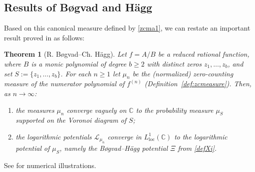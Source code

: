 \documentclass[12pt]{article}
\theoremstyle{plain}
\newtheorem{theorem}{Theorem}
\theoremstyle{definition}
\begin{document}
\subsection{Results of B\o gvad and H\"agg}\label{subsec31}

Based on this canonical measure defined by \eqref{zcma1}, we can restate an important result proved in \cite{B:H} as follows:

\begin{theorem}[R. B\o gvad--Ch. H\"agg]\label{thr1}
Let $f=A/B$ be a reduced rational function, where $B$ is a monic polynomial of degree
$b\geq 2$ with distinct zeros $z_1,\ldots,z_b$, and set $S:=\{z_1,\ldots,z_b\}$.
For each $n\ge1$ let $\mu_n$ be the (normalized) zero-counting measure of the numerator polynomial of $f^{(n)}$ (Definition~\ref{def:zcmeasure}).
Then, as $n\to\infty$:
\begin{enumerate}
\item[(a)] the measures $\mu_n$ converge vaguely on $\mathbb C$ to the probability measure $\mu_S$ supported on the Voronoi diagram of $S$;
\item[(b)] the logarithmic potentials $\mathcal L_{\mu_n}$ converge in $L^{1}_{\mathrm{loc}}(\mathbb C)$ to the logarithmic potential of $\mu_S$, namely the B\o gvad--H\"agg potential $\Xi$ from \eqref{defXi}.
\end{enumerate}
\end{theorem}
See \cite{B:H} for numerical illustrations.
\end{document}
